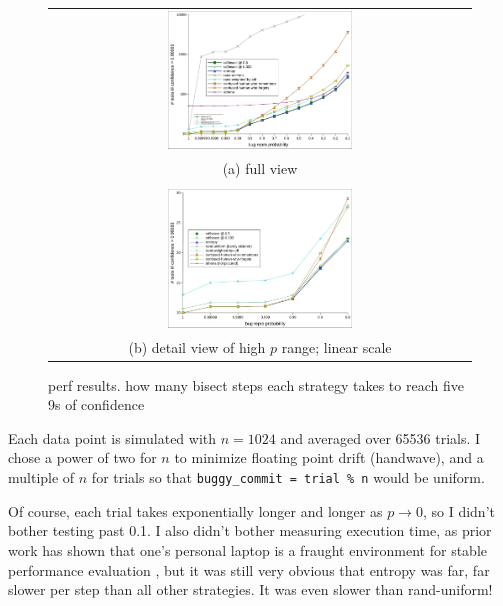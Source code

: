 \documentclass[11pt]{sigplanconf}
\begin{document}
\begin{figure}[ht]
	\begin{tabular}{c}
		\includegraphics[width=0.45\textwidth]{resulce.pdf}
		\\
		(a) full view
		\\
		\\
		\includegraphics[width=0.45\textwidth]{resulce-detail.pdf}
		\\
		(b) detail view of high $p$ range; linear scale
	\end{tabular}
	\caption{perf results.
	how many bisect steps each strategy takes to reach five 9s of confidence} %
	\label{fig:resulce}
\end{figure}

Each data point is simulated with $n=1024$ and averaged over 65536 trials.
I chose a power of two for $n$ to minimize floating point drift (handwave),
and a multiple of $n$ for trials so that {\tt buggy\_commit = trial \% n} would be uniform.

Of course, each trial takes exponentially
longer and longer as $p \rightarrow 0$, so I didn't bother testing past 0.1.
I also didn't bother measuring execution time,
as prior work has shown that one's personal laptop is a fraught environment for stable performance evaluation \cite{htm},
but it was still very obvious that {\sf entropy} was far, far slower per step than all other strategies.
It was even slower than {\sf rand-uniform}!
\end{document}
